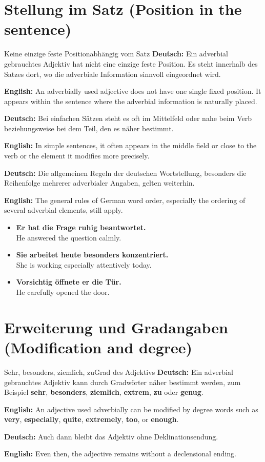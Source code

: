 \documentclass[a4paper,11pt]{article}
\newcommand{\GermanText}[1]{\textbf{Deutsch: }#1\par}
\newcommand{\EnglishText}[1]{{\small\color{SoftGray}\textbf{English: }#1\par}}
\newcommand{\ExampleItem}[2]{\item \textbf{#1}\\{\small\color{SoftGray}#2}}
\begin{document}
    \section{Stellung im Satz \textnormal{(Position in the sentence)}}

        \begin{grammarentry}{Keine einzige feste Position}{abhängig vom Satz}
            \GermanText{Ein adverbial gebrauchtes Adjektiv hat nicht eine einzige feste Position. Es steht innerhalb des Satzes dort, wo die adverbiale Information sinnvoll eingeordnet wird.}
            \EnglishText{An adverbially used adjective does not have one single fixed position. It appears within the sentence where the adverbial information is naturally placed.}

            \GermanText{Bei einfachen Sätzen steht es oft im Mittelfeld oder nahe beim Verb beziehungsweise bei dem Teil, den es näher bestimmt.}
            \EnglishText{In simple sentences, it often appears in the middle field or close to the verb or the element it modifies more precisely.}

            \GermanText{Die allgemeinen Regeln der deutschen Wortstellung, besonders die Reihenfolge mehrerer adverbialer Angaben, gelten weiterhin.}
            \EnglishText{The general rules of German word order, especially the ordering of several adverbial elements, still apply.}
        \end{grammarentry}

        \begin{exbox}
            \begin{itemize}
                \ExampleItem{Er hat die Frage ruhig beantwortet.}{He answered the question calmly.}
                \ExampleItem{Sie arbeitet heute besonders konzentriert.}{She is working especially attentively today.}
                \ExampleItem{Vorsichtig öffnete er die Tür.}{He carefully opened the door.}
            \end{itemize}
        \end{exbox}

    \section{Erweiterung und Gradangaben \textnormal{(Modification and degree)}}

        \begin{grammarentry}{Sehr, besonders, ziemlich, zu}{Grad des Adjektivs}
            \GermanText{Ein adverbial gebrauchtes Adjektiv kann durch Gradwörter näher bestimmt werden, zum Beispiel \textbf{sehr}, \textbf{besonders}, \textbf{ziemlich}, \textbf{extrem}, \textbf{zu} oder \textbf{genug}.}
            \EnglishText{An adjective used adverbially can be modified by degree words such as \textbf{very}, \textbf{especially}, \textbf{quite}, \textbf{extremely}, \textbf{too}, or \textbf{enough}.}

            \GermanText{Auch dann bleibt das Adjektiv ohne Deklinationsendung.}
            \EnglishText{Even then, the adjective remains without a declensional ending.}
        \end{grammarentry}
\end{document}
